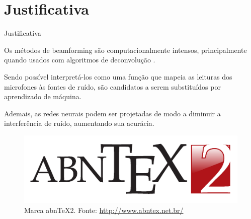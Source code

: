 \documentclass[aspectratio=169]{beamer}
\begin{document}
\section{Justificativa}
\begin{frame}{Justificativa}

Os métodos de beamforming são computacionalmente intensos, 
principalmente quando usados com algoritmos de deconvolução
\cite{carranza_2022_beamforming}.
\vspace{5pt}

Sendo possível interpretá-los como
uma função que mapeia as leituras dos microfones
às fontes de ruído,
são candidatos a serem substituídos por
aprendizado de máquina.
\vspace{5pt}

Ademais, as redes neurais podem ser projetadas
de modo a diminuir a interferência de ruído,
\cite{ibias2024noise}
aumentando sua acurácia.

\end{frame}

\begin{frame}

\begin{figure}
  \centering
  \includegraphics[scale=1.0]{abntex2-modelo-img-marca.pdf}
  \caption{Marca abnTeX2. Fonte: \url{http://www.abntex.net.br/}}
\end{figure}

\end{frame}

\end{document}
